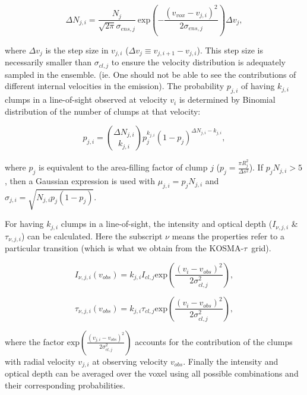 \documentclass[a4paper]{article}
\newcommand{\kosmatau}{KOSMA-\(\tau\)}
\begin{document}
    \begin{equation}
    \label{delta Nji}
    \Delta N_{j,i} = \frac{N_j}{\sqrt{2 \pi} \sigma_{ens,j}} \ \mathrm{exp} \left( -\frac{(v_{vox}-v_{j,i})^2}{2 \sigma_{ens, j}} \right) \Delta v_j,
    \end{equation}

    where \(\Delta v_j\) is the step size in \(v_{j,i}\) (\(\Delta v_j \equiv v_{j,i+1} - v_{j,i}\)).
    This step size is necessarily smaller than \(\sigma_{cl,j}\) to ensure the velocity distribution is adequately sampled in the ensemble.
    (ie. One should not be able to see the contributions of different internal velocities in the emission).
    The probability \(p_{j,i}\) of having \(k_{j,i}\) clumps in a line-of-sight observed at velocity \(v_i\) is determined by Binomial distribution of the number of clumps at that velocity:

    \begin{equation}
    \label{combination probability}
    p_{j,i} = \binom{\Delta N_{j,i}}{k_{j,i}} p_j^{k_{j,i}} (1-p_j)^{\Delta N_{j,i}-k_{j,i}},
    \end{equation}

    where \(p_j\) is equivalent to the area-filling factor of clump \(j\) (\(p_j = \frac{\pi R_{j}^2}{\Delta s^2}\)).
    If \(p_j N_{j,i}>5\), then a Gaussian expression is used with \(\mu_{j,i} = p_j N_{j,i}\) and \(\sigma_{j,i} = \sqrt{N_{j,i} p_j (1-p_j)}\).

    For having \(k_{j,i}\) clumps in a line-of-sight, the intensity and optical depth (\(I_{\nu,j,i}\) \& \(\tau_{\nu,j,i}\)) can be calculated.
    Here the subscript \(\nu\) means the properties refer to a particular transition (which is what we obtain from the \kosmatau \ grid).

    \begin{equation}
    \label{los intensity}
    I_{\nu,j,i} (v_{obs}) = k_{j,i} I_{cl,j} \mathrm{exp} \left( \frac{(v_i-v_{obs})^2}{2\sigma_{cl, j}^2} \right),
    \end{equation}

    \begin{equation}
    \label{los optical depth}
    \tau_{\nu,j,i} (v_{obs}) = k_{j,i} \tau_{cl,j} \mathrm{exp} \left( \frac{(v_i-v_{obs})^2}{2\sigma_{cl, j}^2} \right),
    \end{equation}

    where the factor \(\mathrm{exp}(\frac{(v_{j,i} - v_{obs})^2}{2 \sigma_{cl, j}^2})\) accounts for the contribution of the clumps with radial velocity \(v_{j,i}\) at observing velocity \(v_{obs}\).
    Finally the intensity and optical depth can be averaged over the voxel using all possible combinations and their corresponding probabilities.
\end{document}
